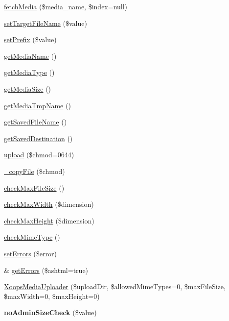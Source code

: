 \begin{DoxyCompactItemize}
\item 
\hyperlink{class_xoops_media_uploader_ad1dbaec1a315a6029fede8734dd24b70}{fetch\-Media} (\$media\-\_\-name, \$index=null)
\item 
\hyperlink{class_xoops_media_uploader_a8c8b456303f7a25f6a8c6a0b90c66a33}{set\-Target\-File\-Name} (\$value)
\item 
\hyperlink{class_xoops_media_uploader_a5ebb5eee91e4d2d671cd1657c92373e9}{set\-Prefix} (\$value)
\item 
\hyperlink{class_xoops_media_uploader_adbee91ac0dbb9f0aa122e91575a05327}{get\-Media\-Name} ()
\item 
\hyperlink{class_xoops_media_uploader_ae415e4abfc18ab4178c49953159e1233}{get\-Media\-Type} ()
\item 
\hyperlink{class_xoops_media_uploader_a35c2eb91d973a6aeef9d5d9911ae8bef}{get\-Media\-Size} ()
\item 
\hyperlink{class_xoops_media_uploader_a8cbf73083852cdf8af7b869b7609cf0a}{get\-Media\-Tmp\-Name} ()
\item 
\hyperlink{class_xoops_media_uploader_aadb0a65175d99f96b73d8e1df8875682}{get\-Saved\-File\-Name} ()
\item 
\hyperlink{class_xoops_media_uploader_a34505b2d173498c2ecd774b750de7605}{get\-Saved\-Destination} ()
\item 
\hyperlink{class_xoops_media_uploader_a6ade22bee6de9b13551d3e0b0d7c51e3}{upload} (\$chmod=0644)
\item 
\hyperlink{class_xoops_media_uploader_a78d56207e3942c1ca1bf7fec2cec6d00}{\-\_\-copy\-File} (\$chmod)
\item 
\hyperlink{class_xoops_media_uploader_a8984ff0beb438b73dfdc7ea035213aed}{check\-Max\-File\-Size} ()
\item 
\hyperlink{class_xoops_media_uploader_a981f6f84efb69a23a93ea27278c6913f}{check\-Max\-Width} (\$dimension)
\item 
\hyperlink{class_xoops_media_uploader_ab49dc954cbf9cf119b64f5628d15d42d}{check\-Max\-Height} (\$dimension)
\item 
\hyperlink{class_xoops_media_uploader_aceaef1e1bd2475a8ff3c79f6236f1a10}{check\-Mime\-Type} ()
\item 
\hyperlink{class_xoops_media_uploader_af4480e301c23de87249e79abc3676147}{set\-Errors} (\$error)
\item 
\& \hyperlink{class_xoops_media_uploader_aefb77c7229e1a4bf89b7c9e68b14cd1d}{get\-Errors} (\$ashtml=true)
\item 
\hyperlink{class_xoops_media_uploader_a95f70e2c523540c11f111e079847612a}{Xoops\-Media\-Uploader} (\$upload\-Dir, \$allowed\-Mime\-Types=0, \$max\-File\-Size, \$max\-Width=0, \$max\-Height=0)
\item 
\hypertarget{class_xoops_media_uploader_a15fda181c4a9c00b0b47b2a2af5b4907}{{\bfseries no\-Admin\-Size\-Check} (\$value)}\label{class_xoops_media_uploader_a15fda181c4a9c00b0b47b2a2af5b4907}


\end{DoxyCompactItemize}
